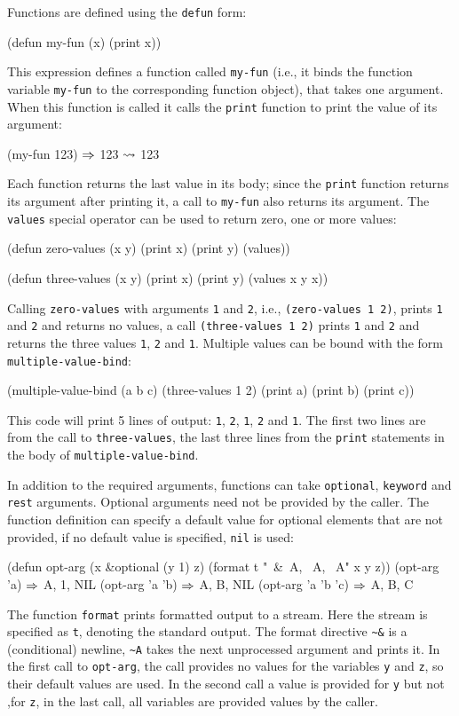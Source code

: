 \documentclass[a4paper]{amsart}
\begin{document}
Functions are defined using the \texttt{defun} form:
\begin{Code}
  (defun my-fun (x)
    (print x))
\end{Code}
This expression defines a function called \texttt{my-fun} (i.e., it
binds the function variable \texttt{my-fun} to the corresponding
function object), that takes one argument.  When this function is
called it calls the \texttt{print} function to print the value of its
argument:
\begin{Code}
  (my-fun 123)
  $\Rightarrow$ 123
  $\rightsquigarrow$ 123
\end{Code}
Each function returns the last value in its body; since the
\texttt{print} function returns its argument after printing it, a call
to \texttt{my-fun} also returns its argument.  The \texttt{values}
special operator can be used to return zero, one or more values:
\begin{Code}
  (defun zero-values (x y)
    (print x)
    (print y)
    (values))

  (defun three-values (x y)
    (print x)
    (print y)
    (values x y x))
\end{Code}
Calling \texttt{zero-values} with arguments \texttt{1} and \texttt{2},
i.e., \texttt{(zero-values 1 2)}, prints \texttt{1} and \texttt{2} and
returns no values, a call \texttt{(three-values 1 2)} prints
\texttt{1} and \texttt{2} and returns the three values \texttt{1},
\texttt{2} and \texttt{1}.  Multiple values can be bound with the form
\texttt{multiple-value-bind}:
\begin{Code}
  (multiple-value-bind (a b c) (three-values 1 2)
    (print a)
    (print b)
    (print c))
\end{Code}
This code will print 5 lines of output: \texttt{1}, \texttt{2},
\texttt{1}, \texttt{2} and \texttt{1}.  The first two lines are from
the call to \texttt{three-values}, the last three lines from the
\texttt{print} statements in the body of \texttt{multiple-value-bind}.

In addition to the required arguments, functions can take
\texttt{optional}, \texttt{keyword} and \texttt{rest} arguments.
Optional arguments need not be provided by the caller.  The function
definition can specify a default value for optional elements that are
not provided, if no default value is specified, \texttt{nil} is used:
\begin{Code}
  (defun opt-arg (x &optional (y 1) z)
    (format t "~&~A, ~A, ~A" x y z))
  (opt-arg 'a)             $\Rightarrow$ A, 1, NIL
  (opt-arg 'a 'b)          $\Rightarrow$ A, B, NIL
  (opt-arg 'a 'b 'c)       $\Rightarrow$ A, B, C
\end{Code}
The function \texttt{format} prints formatted output to a stream.
Here the stream is specified as \texttt{t}, denoting the standard
 output.  The format directive \verb|~&| is a (conditional) newline,
\verb|~A| takes the next unprocessed argument and prints it.  In the
first call to \texttt{opt-arg}, the call provides no values for the
variables \texttt{y} and \texttt{z}, so their default values are
used.  In the second call a value is provided for \texttt{y} but not
,for \texttt{z}, in the last call, all variables are provided values
by the caller.
\end{document}
